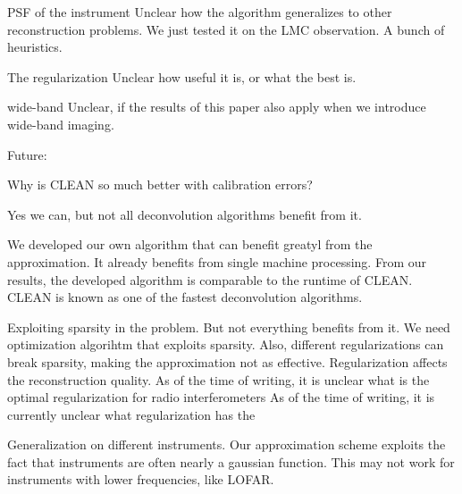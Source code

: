 PSF of the instrument
Unclear how the algorithm generalizes to other reconstruction problems. We just tested it on the LMC observation. A bunch of heuristics.

The regularization
Unclear how useful it is, or what the best is.

wide-band
Unclear, if the results of this paper also apply when we introduce wide-band imaging.


Future:








Why is CLEAN so much better with calibration errors?


Yes we can, but not all deconvolution algorithms benefit from it.

We developed our own algorithm that can benefit greatyl from the approximation. It already benefits from single machine processing. From our results, the developed algorithm is comparable to the runtime of CLEAN. CLEAN is known as one of the fastest deconvolution algorithms.

Exploiting sparsity in the problem. But not everything benefits from it. We need optimization algorihtm that exploits sparsity. Also, different regularizations can break sparsity, making the approximation not as effective.
Regularization affects the reconstruction quality. As of the time of writing, it is unclear what is the optimal regularization for radio interferometers
As of the time of writing, it is currently unclear what regularization has the



Generalization on different instruments. Our approximation scheme exploits the fact that instruments are often nearly a gaussian function. This may not work for instruments with lower frequencies, like LOFAR. 
 
